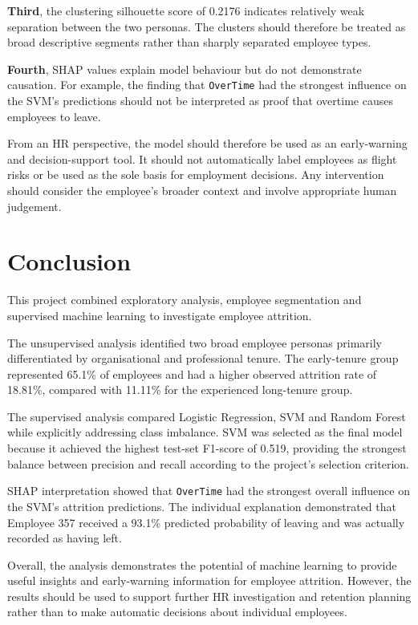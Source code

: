 \documentclass[11pt]{article}
\begin{document}
\textbf{Third}, the clustering silhouette score of 0.2176 indicates relatively weak separation between the two personas. The clusters should therefore be treated as broad descriptive segments rather than sharply separated employee types.

\textbf{Fourth}, SHAP values explain model behaviour but do not demonstrate causation. For example, the finding that \texttt{OverTime} had the strongest influence on the SVM's predictions should not be interpreted as proof that overtime causes employees to leave.

From an HR perspective, the model should therefore be used as an early-warning and decision-support tool. It should not automatically label employees as flight risks or be used as the sole basis for employment decisions. Any intervention should consider the employee's broader context and involve appropriate human judgement.

\section{Conclusion}

This project combined exploratory analysis, employee segmentation and supervised machine learning to investigate employee attrition.

The unsupervised analysis identified two broad employee personas primarily differentiated by organisational and professional tenure. The early-tenure group represented 65.1\% of employees and had a higher observed attrition rate of 18.81\%, compared with 11.11\% for the experienced long-tenure group.

The supervised analysis compared Logistic Regression, SVM and Random Forest while explicitly addressing class imbalance. SVM was selected as the final model because it achieved the highest test-set F1-score of 0.519, providing the strongest balance between precision and recall according to the project's selection criterion.

SHAP interpretation showed that \texttt{OverTime} had the strongest overall influence on the SVM's attrition predictions. The individual explanation demonstrated that Employee 357 received a 93.1\% predicted probability of leaving and was actually recorded as having left.

Overall, the analysis demonstrates the potential of machine learning to provide useful insights and early-warning information for employee attrition. However, the results should be used to support further HR investigation and retention planning rather than to make automatic decisions about individual employees.
\end{document}
